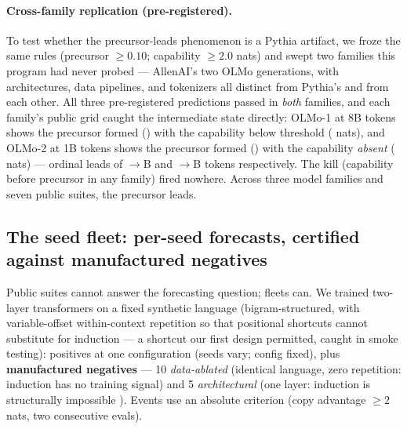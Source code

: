 \documentclass[11pt]{article}
\begin{document}
\paragraph{Cross-family replication (pre-registered).} To test whether the
precursor-leads phenomenon is a Pythia artifact, we froze the same rules (precursor
$\geq 0.10$; capability $\geq 2.0$ nats) and swept two families this program had never
probed --- AllenAI's two OLMo generations, with architectures, data pipelines, and
tokenizers all distinct from Pythia's and from each other. All three pre-registered
predictions passed in \emph{both} families, and each family's public grid caught the
intermediate state directly: OLMo-1 at 8B tokens shows the precursor formed
(\ordOlmoOnePre) with the capability below threshold (\ordOlmoOneCap{} nats), and OLMo-2
at 1B tokens shows the precursor formed (\ordOlmoTwoPre) with the capability
\emph{absent} (\ordOlmoTwoCap{} nats) --- ordinal leads of
\ordOlmoOnePreT{}$\to$\ordOlmoOneCapT{}B and \ordOlmoTwoPreT{}$\to$\ordOlmoTwoCapT{}B
tokens respectively. The kill (capability before precursor in any family) fired
nowhere. Across three model families and seven public suites, the precursor leads.

\subsection{The seed fleet: per-seed forecasts, certified against manufactured
negatives}
\label{sec:fleet}

Public suites cannot answer the forecasting question; fleets can. We trained
\wTotalFleet{} two-layer transformers on a fixed synthetic language (bigram-structured,
with variable-offset within-context repetition so that positional shortcuts cannot
substitute for induction --- a shortcut our first design permitted, caught in smoke
testing): \wFleetPos{} positives at one configuration (seeds vary; config fixed), plus
\wFleetNeg{} \textbf{manufactured negatives} --- 10 \emph{data-ablated} (identical
language, zero repetition: induction has no training signal) and 5 \emph{architectural}
(one layer: induction is structurally impossible \citep{olsson2022context}). Events
use an absolute criterion (copy advantage $\geq 2$ nats, two consecutive evals).
\end{document}
